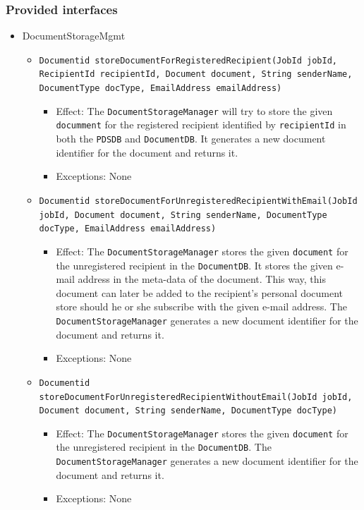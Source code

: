 \documentclass[a4paper,10pt]{article}
\begin{document}
\subsubsection*{Provided interfaces}
\begin{itemize}
    \item DocumentStorageMgmt
    \begin{itemize}
    
        \item \texttt{Documentid storeDocumentForRegisteredRecipient(JobId jobId, RecipientId recipientId, Document document, String senderName, DocumentType docType, EmailAddress emailAddress)}
        \begin{itemize}
            \item Effect: The \texttt{DocumentStorageManager} will try to store the given \texttt{documment} for the registered recipient identified by \texttt{recipientId} in both the \texttt{PDSDB} and \texttt{DocumentDB}.  It generates a new document identifier for the document and returns it.
            \item Exceptions: None
		\end{itemize}
		    
        \item \texttt{Documentid storeDocumentForUnregisteredRecipientWithEmail(JobId jobId, Document document, String senderName, DocumentType docType, EmailAddress emailAddress)}
        \begin{itemize}
            \item Effect: The \texttt{DocumentStorageManager} stores the given \texttt{document} for the unregistered recipient in the \texttt{DocumentDB}. It stores the given e-mail address in the meta-data of the document. This way, this document can later be added to the recipient's personal document store should he or she subscribe with the given e-mail address. The \texttt{DocumentStorageManager} generates a new document identifier for the document and returns it. 
            \item Exceptions: None
		\end{itemize}

        \item \texttt{Documentid storeDocumentForUnregisteredRecipientWithoutEmail(JobId jobId, Document document, String senderName, DocumentType docType)}
        \begin{itemize}
            \item Effect: The \texttt{DocumentStorageManager} stores the given \texttt{document} for the unregistered recipient in the \texttt{DocumentDB}. The \texttt{DocumentStorageManager} generates a new document identifier for the document and returns it. 
            \item Exceptions: None
		\end{itemize}


\end{itemize}
\end{itemize}
\end{document}
